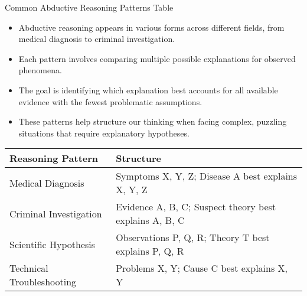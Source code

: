 \documentclass{beamer}
\begin{document}
\begin{frame}{Common Abductive Reasoning Patterns Table}
	\begin{itemize}
		\item Abductive reasoning appears in various forms across different fields, from medical diagnosis to criminal investigation.
		\item Each pattern involves comparing multiple possible explanations for observed phenomena.
		\item The goal is identifying which explanation best accounts for all available evidence with the fewest problematic assumptions.
		\item These patterns help structure our thinking when facing complex, puzzling situations that require explanatory hypotheses.
	\end{itemize}
	
	\begin{table}[h]
		\scriptsize
		\centering
		\begin{tabular}{|l|l|}
			\hline
			\textbf{Reasoning Pattern} & \textbf{Structure} \\
			\hline
			Medical Diagnosis & Symptoms X, Y, Z; Disease A best explains X, Y, Z \\
			\hline
			Criminal Investigation & Evidence A, B, C; Suspect theory best explains A, B, C \\
			\hline
			Scientific Hypothesis & Observations P, Q, R; Theory T best explains P, Q, R \\
			\hline
			Technical Troubleshooting & Problems X, Y; Cause C best explains X, Y \\
			\hline
		\end{tabular}
	\end{table}
\end{frame}
\end{document}
